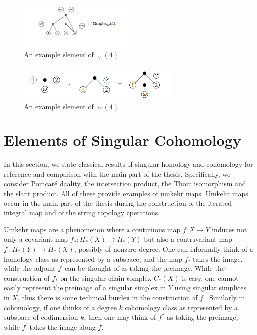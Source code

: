 \documentclass{scrartcl}
\theoremstyle{plain}
\theoremstyle{definition}
\DeclareMathOperator{\coGraphs}{{}^*Graphs}
\begin{document}
\begin{figure}[ht]
    \centering
    \includegraphics[width=0.5\textwidth]{img/cw-graphs-ast-example.png}
    \caption{An example element of $\coGraphs_V(4)$}\label{cw-graphs-ast-example.png}
\end{figure}    
\begin{figure}[ht]
    \centering
    \includegraphics[width=0.7\textwidth]{img/cw-graphs-mult.png}
    \caption{An example element of $\coGraphs_V(4)$}\label{cw-graphs-mult}
\end{figure}



\newpage
\appendix





\section{Elements of Singular Cohomology}

In this section, we state classical results of singular homology and cohomology for reference and comparison with the main part of the thesis. Specifically, we consider Poincaré duality, the intersection product, the Thom isomorphism and the slant product. All of these provide examples of umkehr maps. Umkehr maps occur in the main part of the thesis during the construction of the iterated integral map and of the string topology operations.

Umkehr maps are a phenomenon where a continuous map $f\colon X\to Y$ induces not only a covariant map $f_*\colon H_*(X)\to H_*(Y)$ but also a contravariant map $f_!\colon H_*(Y)\to H_*(X)$, possibly of nonzero degree. One can informally think of a homology class as represented by a subspace, and the map $f_*$ takes the image, while the adjoint $f^!$ can be thought of as taking the preimage. While the construction of $f_*$ on the singular chain complex $C_*(X)$ is easy, one cannot easily represent the preimage of a singular simplex in $Y$ using singular simplices in $X$, thus there is some technical burden in the construction of $f^!$. Similarly in cohomology, if one thinks of a degree $k$ cohomology class as represented by a subspace of codimension $k$, then one may think of $f^*$ as taking the preimage, while $f^!$ takes the image along $f$. 
\end{document}
